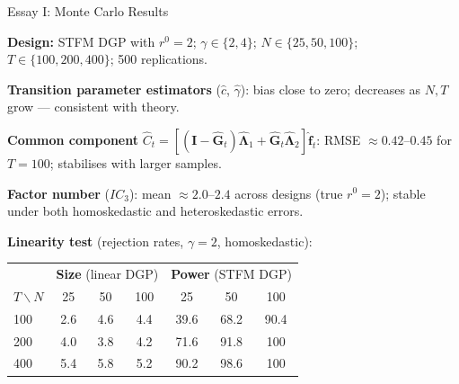 \documentclass{beamer}
\begin{document}
\begin{frame}{Essay I: Monte Carlo Results}

\textbf{Design:} STFM DGP with $r^0=2$; $\gamma\in\{2,4\}$; $N\in\{25,50,100\}$; $T\in\{100,200,400\}$; 500 replications.

\vspace{0.4em}
\textbf{Transition parameter estimators} ($\hat{c}$, $\hat{\gamma}$): bias close to zero; decreases as $N,T$ grow --- consistent with theory.

\vspace{0.3em}
\textbf{Common component} $\hat{C}_t = [(\boldsymbol{I}-\hat{\boldsymbol{G}}_t)\hat{\boldsymbol{\Lambda}}_1+\hat{\boldsymbol{G}}_t\hat{\boldsymbol{\Lambda}}_2]\hat{\boldsymbol{f}}_t$: RMSE $\approx 0.42$--$0.45$ for $T=100$; stabilises with larger samples.

\vspace{0.3em}
\textbf{Factor number} ($IC_3$): mean $\approx 2.0$--$2.4$ across designs (true $r^0=2$); stable under both homoskedastic and heteroskedastic errors.

\vspace{0.3em}
\textbf{Linearity test} (rejection rates, $\gamma=2$, homoskedastic):

{\small
\begin{tabular}{lccc|ccc}
\toprule
 & \multicolumn{3}{c|}{\textbf{Size} (linear DGP)} & \multicolumn{3}{c}{\textbf{Power} (STFM DGP)} \\
$T \backslash N$ & 25 & 50 & 100 & 25 & 50 & 100 \\
\midrule
100 & 2.6 & 4.6 & 4.4 & 39.6 & 68.2 & 90.4 \\
200 & 4.0 & 3.8 & 4.2 & 71.6 & 91.8 & 100 \\
400 & 5.4 & 5.8 & 5.2 & 90.2 & 98.6 & 100 \\
\bottomrule
\end{tabular}
}

\end{frame}
\end{document}
